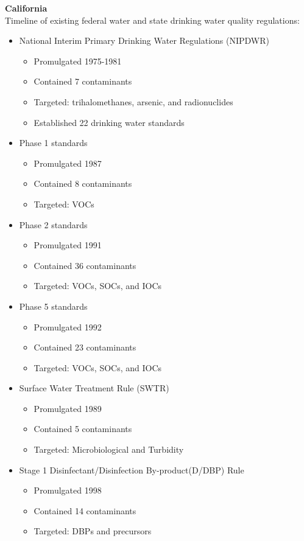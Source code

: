 \documentclass{article}
\begin{document}
\textbf{California}\\
Timeline of existing federal water and state drinking water quality regulations:
\begin{itemize}
\item National Interim Primary Drinking Water Regulations (NIPDWR)
\begin{itemize}
\item Promulgated 1975-1981
\item Contained 7 contaminants
\item Targeted: trihalomethanes, arsenic, and radionuclides
\item Established 22 drinking water standards
\end{itemize}
\item Phase 1 standards
\begin{itemize}
\item Promulgated 1987
\item Contained 8 contaminants
\item Targeted: VOCs
\end{itemize}
\item Phase 2 standards
\begin{itemize}
\item Promulgated 1991
\item Contained 36 contaminants
\item Targeted: VOCs, SOCs, and IOCs
\end{itemize}
\item Phase 5 standards
\begin{itemize}
\item Promulgated 1992
\item Contained 23 contaminants
\item Targeted: VOCs, SOCs, and IOCs
\end{itemize}
\item Surface Water Treatment Rule (SWTR)
\begin{itemize}
\item Promulgated 1989
\item Contained 5 contaminants
\item Targeted: Microbiological and Turbidity
\end{itemize}
\item Stage 1 Disinfectant/Disinfection By-product(D/DBP) Rule
\begin{itemize}
\item Promulgated 1998
\item Contained 14 contaminants
\item Targeted: DBPs and precursors

\end{itemize}
\end{itemize}
\end{document}
